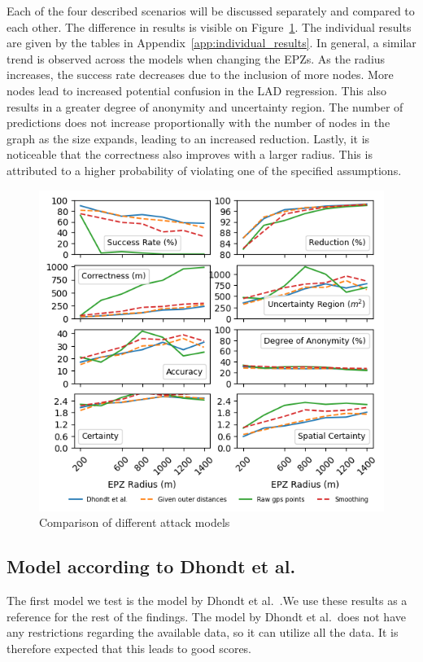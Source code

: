\documentclass[conference]{IEEEtran}
\begin{document}
Each of the four described scenarios will be discussed separately and compared
to each other. The difference in results is visible on
Figure~\ref{fig:attack_comparison}. The individual results are given by the
tables in Appendix~\ref{app:individual_results}. In general, a similar trend is
observed across the models when changing the EPZs. As the radius increases, the
success rate decreases due to the inclusion of more nodes. More nodes lead to
increased potential confusion in the LAD regression. This also results in a
greater degree of anonymity and uncertainty region. The number of predictions
does not increase proportionally with the number of nodes in the graph as the
size expands, leading to an increased reduction. Lastly, it is noticeable that
the correctness also improves with a larger radius. This is attributed to a
higher probability of violating one of the specified assumptions.
\begin{figure}[h]
    \centering
    \includegraphics[width=\linewidth]{fig/result_graphs/all_results.png}
    \caption{Comparison of different attack models}\label{fig:attack_comparison}
\end{figure}

\subsection{Model according to Dhondt et al.}
The first model we test is the model by Dhondt et al.~\cite{Dhondt}.We use
these results as a reference for the rest of the findings. The model by Dhondt
et al.\ does not have any restrictions regarding the available data, so it can
utilize all the data. It is therefore expected that this leads to good scores.
\end{document}
